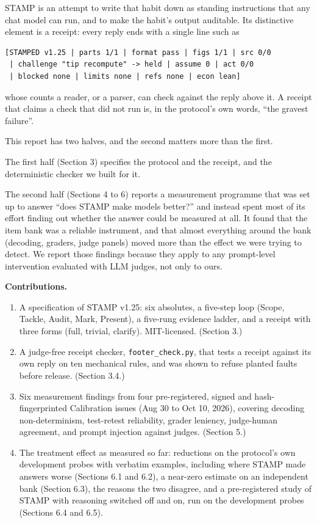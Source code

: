 \documentclass[
  11pt,
]{article}
\providecommand{\tightlist}{%
  \setlength{\itemsep}{0pt}\setlength{\parskip}{0pt}}
\begin{document}
STAMP is an attempt to write that habit down as standing instructions
that any chat model can run, and to make the habit's output auditable.
Its distinctive element is a receipt: every reply ends with a single
line such as

\begin{verbatim}
[STAMPED v1.25 | parts 1/1 | format pass | figs 1/1 | src 0/0
 | challenge "tip recompute" -> held | assume 0 | act 0/0
 | blocked none | limits none | refs none | econ lean]
\end{verbatim}

whose counts a reader, or a parser, can check against the reply above
it. A receipt that claims a check that did not run is, in the protocol's
own words, ``the gravest failure''.

This report has two halves, and the second matters more than the first.

The first half (Section 3) specifies the protocol and the receipt, and
the deterministic checker we built for it.

The second half (Sections 4 to 6) reports a measurement programme that
was set up to answer ``does STAMP make models better?'' and instead
spent most of its effort finding out whether the answer could be
measured at all. It found that the item bank was a reliable instrument,
and that almost everything around the bank (decoding, graders, judge
panels) moved more than the effect we were trying to detect. We report
those findings because they apply to any prompt-level intervention
evaluated with LLM judges, not only to ours.

\textbf{Contributions.}

\begin{enumerate}
\def\labelenumi{\arabic{enumi}.}
\tightlist
\item
  A specification of STAMP v1.25: six absolutes, a five-step loop
  (Scope, Tackle, Audit, Mark, Present), a five-rung evidence ladder,
  and a receipt with three forms (full, trivial, clarify). MIT-licensed.
  (Section 3.)
\item
  A judge-free receipt checker, \texttt{footer\_check.py}, that tests a
  receipt against its own reply on ten mechanical rules, and was shown
  to refuse planted faults before release. (Section 3.4.)
\item
  Six measurement findings from four pre-registered, signed and
  hash-fingerprinted Calibration issues (Aug 30 to Oct 10, 2026),
  covering decoding non-determinism, test-retest reliability, grader
  leniency, judge-human agreement, and prompt injection against judges.
  (Section 5.)
\item
  The treatment effect as measured so far: reductions on the protocol's
  own development probes with verbatim examples, including where STAMP
  made answers worse (Sections 6.1 and 6.2), a near-zero estimate on an
  independent bank (Section 6.3), the reasons the two disagree, and a
  pre-registered study of STAMP with reasoning switched off and on, run
  on the development probes (Sections 6.4 and 6.5).
\end{enumerate}
\end{document}
